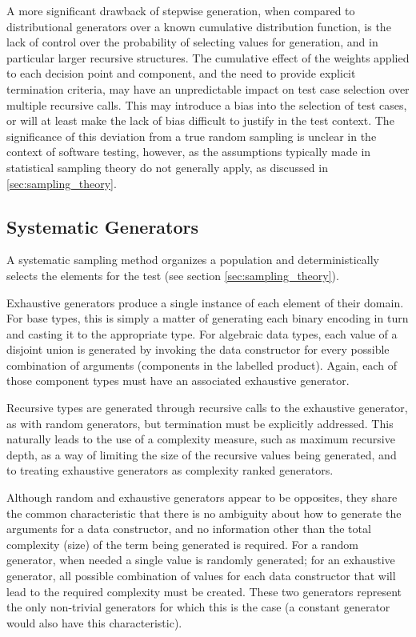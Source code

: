 A more significant drawback of stepwise generation,
when compared to distributional generators over a known cumulative distribution function,
is the lack of control over the probability of selecting values for generation,
and in particular larger recursive structures.
The cumulative effect of the weights applied to each decision point and component,
and the need to provide explicit termination criteria,
may have an unpredictable impact on test case selection over multiple recursive calls.
This may introduce a bias into the selection of test cases,
or will at least make the lack of bias difficult to justify in the test context.
The significance of this deviation from a true random sampling
is unclear in the context of software testing, however,
as the assumptions typically made in statistical sampling theory
do not generally apply, as discussed in \ref{sec:sampling_theory}.

\subsection{Systematic Generators}

A systematic sampling method organizes a population and
deterministically selects the elements for the test
(see section \ref{sec:sampling_theory}).

Exhaustive generators produce a single instance of each element of their domain.
For base types, this is simply a matter of generating each binary encoding in turn
and casting it to the appropriate type.
For algebraic data types,
each value of a disjoint union is generated
by invoking the  data constructor for every possible combination of arguments
(components in the labelled product).
Again, each of those component types must have an associated exhaustive generator.

Recursive types are generated through recursive calls to the exhaustive generator,
as with random generators, 
but termination must be explicitly addressed.
This naturally leads to the use of a complexity measure,
such as maximum recursive depth,
as a way of limiting the size of the recursive values being generated,
and to treating exhaustive generators as complexity ranked generators.

Although random and exhaustive generators appear to be opposites,
they share the common characteristic that there is no ambiguity
about how to generate the arguments for a data constructor,
and no information other than the total complexity (size) of the term being generated is required.
For a random generator,
when needed a single value is randomly generated;
for an exhaustive generator,
all possible combination of values for each data constructor
that will lead to the required complexity must be created.
These two generators represent the only non-trivial generators
for which this is the case
(a constant generator would also have this characteristic).

